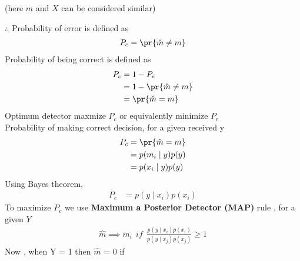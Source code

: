 \documentclass[journal,12pt,twocolumn]{IEEEtran}
\begin{document}
\begin{center}
(here $m$ and $X$ can be considered similar)
\end{center}
$\therefore$ Probability of error is defined as 
\begin{align}
    P_e = \pr{\hat{m} \neq m}
\end{align}
Probability of being correct is defined as
\begin{align}
    P_c & = 1 - P_e  \\
        & = 1 - \pr{\hat{m} \neq m} \\
        & = \pr{\hat{m} = m} 
\end{align}
Optimum detector maxmize $P_c$ or equivalently minimize $P_e$ \\ Probability of making correct decision, for a given received y 
\begin{align}
    P_c & = \pr{\hat{m} = m} \\
        & = p(m_i \mid y) p(y) \\
        & = p(x_i \mid y) p(y)
\end{align}
Using Bayes theorem,
\begin{align}
    P_c & = p(y \mid x_i) p(x_i)
\end{align}
To maximize $P_c$ we use \textbf{Maximum a Posterior Detector (MAP)} rule , for a given $Y$
\begin{align}
    \hat{m} \implies m_i \ \ if \ \ \frac{p(y \mid x_i) p(x_i)}{p(y \mid x_j) p(x_j)} \geq 1
\end{align}
Now , when Y = 1 then $\hat{m}$ = 0 if
 
\end{document}
